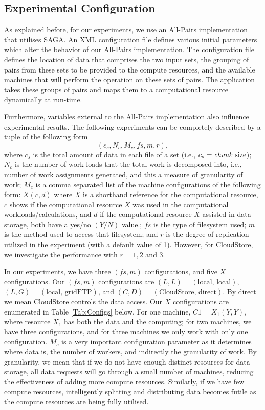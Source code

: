 \documentclass{rspublic}
\begin{document}
\subsection{Experimental Configuration}

As explained before, for our experiments, we use an All-Pairs
implementation that utilises SAGA. An XML configuration file defines
various initial parameters which alter the behavior of our All-Pairs
implementation. The configuration file defines the location of data that
comprises the two input sets, the grouping of pairs from these sets to
be provided to the compute resources, and the available machines that
will perform the operation on these sets of pairs. The application takes
these groups of pairs and maps them to a computational resource
dynamically at run-time.  

Furthermore, variables external to the All-Pairs implementation also
influence experimental results. The following experiments can be
completely described by a tuple of the following form
 \begin{equation}
(c_s, N_c, M_c, fs, m,r),
\label{Eq:tuple}
\end{equation}
where $c_s$ is the total amount of data in each file of a set (i.e.,
$c_s=\mbox{\textit{chunk} size}$); $N_c$ is the number of work-loads
that the total work is decomposed into, i.e., number of work assignments
generated, and this a measure of granularity of work; $M_c$ is a comma
separated list of the machine configurations of the following form:
$X(c, d)$ where $X$ is a shorthand reference for the computational
resource, $c$ shows if the computational resource $X$ was used in the
computational workloads/calculations, and $d$ if the computational
resource $X$ assisted in data storage, both have a yes/no $(Y/N)$
value.; $fs$ is the type of filesystem used; $m$ is the method used to
access that filesystem; and $r$ is the degree of replication utilized in
the experiment (with a default value of 1).  However, for CloudStore, we
investigate the performance with $r = 1, 2 \mbox{ and } 3$.

In our experiments, we have three $(fs, m)$ configurations, and five $X$
configurations. Our $(fs, m)$ configurations are $(L,L)=(\mbox{local,
local})$, $(L,G)=(\mbox{local, gridFTP})$, and $(C,D)=(\mbox{CloudStore,
direct})$. By direct we mean CloudStore controls the data access.  Our
$X$ configurations are enumerated in Table \ref{Tab:Configs} below.  For
one machine, $C1=X_1(Y,Y)$, where resource $X_1$ has both the data and
the computing; for two machines, we have three configurations, and for
three machines we only work with only one configuration. $M_c$ is a very
important configuration parameter as it determines where data is, the
number of workers, and indirectly the granularity of work. By
granularity, we mean that if we do not have enough distinct resources
for data storage, all data requests will go through a small number of
machines, reducing the effectiveness of adding more compute resources.
Similarly, if we have few compute resources, intelligently splitting and
distributing data becomes futile as the compute resources are being
fully utilised.
\end{document}
